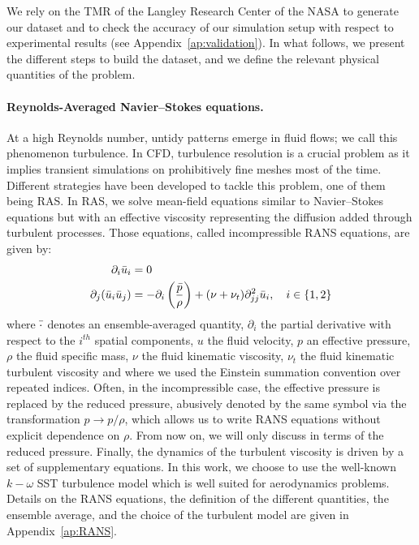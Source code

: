 We rely on the \acrfull{TMR} of the Langley Research Center of the \acrshort{NASA} \cite{TMR, NACA0012-1, NACA0012-2, NACA4412} to generate our dataset and to check the accuracy of our simulation setup with respect to experimental results (see Appendix~\ref{ap:validation}). In what follows, we present the different steps to build the dataset, and we define the relevant physical quantities of the problem.

\paragraph{Reynolds-Averaged Navier–Stokes equations.} At a high Reynolds number, untidy patterns emerge in fluid flows; we call this phenomenon turbulence. In \acrshort{CFD}, turbulence resolution is a crucial problem as it implies transient simulations on prohibitively fine meshes most of the time. Different strategies have been developed to tackle this problem, one of them being \acrshort{RAS}. In \acrshort{RAS}, we solve mean-field equations similar to Navier–Stokes equations but with an effective viscosity representing the diffusion added through turbulent processes. Those equations, called incompressible \acrshort{RANS} equations, are given by:
\begin{align}
	\partial_i \Bar{u}_i &= 0 \\
	\partial_j(\Bar{u}_i\Bar{u}_j) &= -\partial_i\left(\frac{\Bar{p}}{\rho}\right) + (\nu + \nu_t)\partial^2_{jj}\Bar{u}_i, \quad i\in\{1,2\}
\end{align}
where $\Bar{\cdot}$ denotes an ensemble-averaged quantity, $\partial_i$ the partial derivative with respect to the $i^{th}$ spatial components, $u$ the fluid velocity, $p$ an effective pressure, $\rho$ the fluid specific mass, $\nu$ the fluid kinematic viscosity, $\nu_t$ the fluid kinematic turbulent viscosity and where we used the Einstein summation convention over repeated indices. Often, in the incompressible case, the effective pressure is replaced by the reduced pressure, abusively denoted by the same symbol via the transformation $p \rightarrow p/\rho$, which allows us to write \acrshort{RANS} equations without explicit dependence on $\rho$. From now on, we will only discuss in terms of the reduced pressure. Finally, the dynamics of the turbulent viscosity is driven by a set of supplementary equations. In this work, we choose to use the well-known $k-\omega$ SST turbulence model \cite{SST} which is well suited for aerodynamics problems. Details on the \acrshort{RANS} equations, the definition of the different quantities, the ensemble average, and the choice of the turbulent model are given in Appendix~\ref{ap:RANS}.


